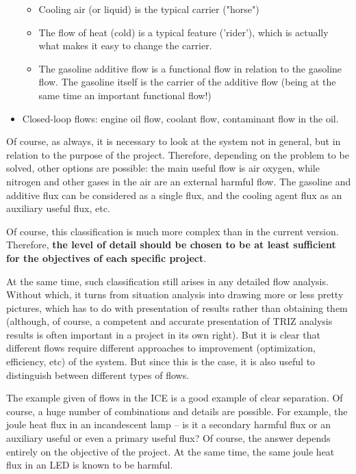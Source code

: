 \documentclass[a4paper,11pt]{article}
\begin{document}
\begin{itemize}
  \begin{itemize}
  \item Cooling air (or liquid) is the typical carrier ("horse")
  \item The flow of heat (cold) is a typical feature ('rider'), which is
    actually what makes it easy to change the carrier.
  \item The gasoline additive flow is a functional flow in relation to the
    gasoline flow. The gasoline itself is the carrier of the additive flow
    (being at the same time an important functional flow!)
  \end{itemize}
\item Closed-loop flows: engine oil flow, coolant flow, contaminant flow in
  the oil.
\end{itemize}
Of course, as always, it is necessary to look at the system not in general,
but in relation to the purpose of the project. Therefore, depending on the
problem to be solved, other options are possible: the main useful flow is air
oxygen, while nitrogen and other gases in the air are an external harmful
flow. The gasoline and additive flux can be considered as a single flux, and
the cooling agent flux as an auxiliary useful flux, etc.

Of course, this classification is much more complex than in the current
version.  Therefore, \textbf{the level of detail should be chosen to be at
  least sufficient for the objectives of each specific project}.

At the same time, such classification still arises in any detailed flow
analysis. Without which, it turns from situation analysis into drawing more or
less pretty pictures, which has to do with presentation of results rather than
obtaining them (although, of course, a competent and accurate presentation of
TRIZ analysis results is often important in a project in its own right). But
it is clear that different flows require different approaches to improvement
(optimization, efficiency, etc) of the system. But since this is the case, it
is also useful to distinguish between different types of flows.

The example given of flows in the ICE is a good example of clear separation.
Of course, a huge number of combinations and details are possible. For
example, the joule heat flux in an incandescent lamp -- is it a secondary
harmful flux or an auxiliary useful or even a primary useful flux?  Of course,
the answer depends entirely on the objective of the project. At the same time,
the same joule heat flux in an LED is known to be harmful.
\end{document}
